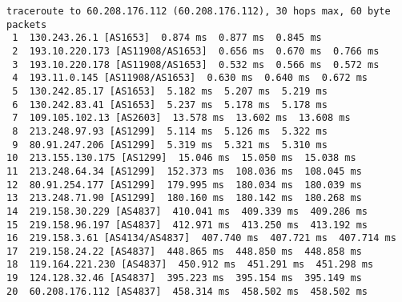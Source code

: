 \documentclass[runningheads,a4paper]{llncs}
\begin{document}
\begin{lstlisting}[basicstyle=\scriptsize\ttfamily,captionpos=b,caption={Traceroute after scan.},label=lst:tr2]
traceroute to 60.208.176.112 (60.208.176.112), 30 hops max, 60 byte packets
 1  130.243.26.1 [AS1653]  0.874 ms  0.877 ms  0.845 ms
 2  193.10.220.173 [AS11908/AS1653]  0.656 ms  0.670 ms  0.766 ms
 3  193.10.220.178 [AS11908/AS1653]  0.532 ms  0.566 ms  0.572 ms
 4  193.11.0.145 [AS11908/AS1653]  0.630 ms  0.640 ms  0.672 ms
 5  130.242.85.17 [AS1653]  5.182 ms  5.207 ms  5.219 ms
 6  130.242.83.41 [AS1653]  5.237 ms  5.178 ms  5.178 ms
 7  109.105.102.13 [AS2603]  13.578 ms  13.602 ms  13.608 ms
 8  213.248.97.93 [AS1299]  5.114 ms  5.126 ms  5.322 ms
 9  80.91.247.206 [AS1299]  5.319 ms  5.321 ms  5.310 ms
10  213.155.130.175 [AS1299]  15.046 ms  15.050 ms  15.038 ms
11  213.248.64.34 [AS1299]  152.373 ms  108.036 ms  108.045 ms
12  80.91.254.177 [AS1299]  179.995 ms  180.034 ms  180.039 ms
13  213.248.71.90 [AS1299]  180.160 ms  180.142 ms  180.268 ms
14  219.158.30.229 [AS4837]  410.041 ms  409.339 ms  409.286 ms
15  219.158.96.197 [AS4837]  412.971 ms  413.250 ms  413.192 ms
16  219.158.3.61 [AS4134/AS4837]  407.740 ms  407.721 ms  407.714 ms
17  219.158.24.22 [AS4837]  448.865 ms  448.850 ms  448.858 ms
18  119.164.221.230 [AS4837]  450.912 ms  451.291 ms  451.298 ms
19  124.128.32.46 [AS4837]  395.223 ms  395.154 ms  395.149 ms
20  60.208.176.112 [AS4837]  458.314 ms  458.502 ms  458.502 ms
\end{lstlisting}
\end{document}
